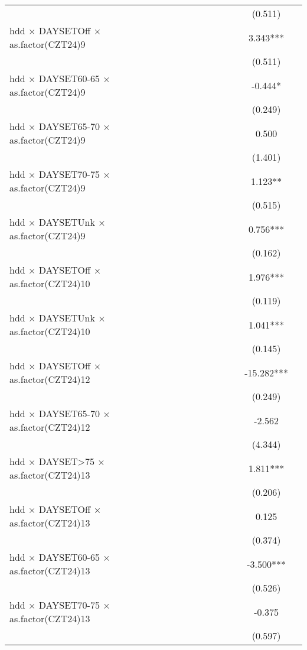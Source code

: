 \documentclass[
]{article}
\begin{document}
\begin{table}
{\begin{tabular}[t]{lcccccccccc}
 &  &  &  &  &  &  &  &  & (0.511) \vphantom{1} & \\
hdd × DAYSETOff × as.factor(CZT24)9 &  &  &  &  &  &  &  &  & 3.343*** & \\
 &  &  &  &  &  &  &  &  & (0.511) & \\
hdd × DAYSET60-65 × as.factor(CZT24)9 &  &  &  &  &  &  &  &  & -0.444* & \\
 &  &  &  &  &  &  &  &  & (0.249) \vphantom{1} & \\
hdd × DAYSET65-70 × as.factor(CZT24)9 &  &  &  &  &  &  &  &  & 0.500 & \\
 &  &  &  &  &  &  &  &  & (1.401) & \\
hdd × DAYSET70-75 × as.factor(CZT24)9 &  &  &  &  &  &  &  &  & 1.123** & \\
 &  &  &  &  &  &  &  &  & (0.515) & \\
hdd × DAYSETUnk × as.factor(CZT24)9 &  &  &  &  &  &  &  &  & 0.756*** & \\
 &  &  &  &  &  &  &  &  & (0.162) & \\
hdd × DAYSETOff × as.factor(CZT24)10 &  &  &  &  &  &  &  &  & 1.976*** & \\
 &  &  &  &  &  &  &  &  & (0.119) & \\
hdd × DAYSETUnk × as.factor(CZT24)10 &  &  &  &  &  &  &  &  & 1.041*** & \\
 &  &  &  &  &  &  &  &  & (0.145) & \\
hdd × DAYSETOff × as.factor(CZT24)12 &  &  &  &  &  &  &  &  & -15.282*** & \\
 &  &  &  &  &  &  &  &  & (0.249) & \\
hdd × DAYSET65-70 × as.factor(CZT24)12 &  &  &  &  &  &  &  &  & -2.562 & \\
 &  &  &  &  &  &  &  &  & (4.344) & \\
hdd × DAYSET>75 × as.factor(CZT24)13 &  &  &  &  &  &  &  &  & 1.811*** & \\
 &  &  &  &  &  &  &  &  & (0.206) & \\
hdd × DAYSETOff × as.factor(CZT24)13 &  &  &  &  &  &  &  &  & 0.125 & \\
 &  &  &  &  &  &  &  &  & (0.374) & \\
hdd × DAYSET60-65 × as.factor(CZT24)13 &  &  &  &  &  &  &  &  & -3.500*** & \\
 &  &  &  &  &  &  &  &  & (0.526) & \\
hdd × DAYSET70-75 × as.factor(CZT24)13 &  &  &  &  &  &  &  &  & -0.375 & \\
 &  &  &  &  &  &  &  &  & (0.597) & \\

\end{tabular}}
\end{table}
\end{document}
